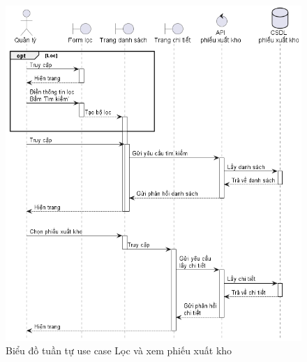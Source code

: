 \documentclass[../DoAn.tex]{subfiles}
\begin{document}
\begin{figure}[H]
    \centering
    \includegraphics[width=1\textwidth]{Hinhve/sequences/ExportReportFilter.png}
    \caption{Biểu đồ tuần tự use case Lọc và xem phiếu xuất kho}
    \label{figure:sd-exportreport-filter}
\end{figure}
\break
\end{document}
